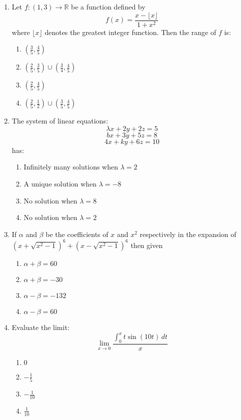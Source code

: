 \documentclass{article}
\begin{document}
\begin{enumerate}
\item Let $f: (1,3) \to \mathbb{R}$ be a function defined by 
\[
f(x) = \frac{x - \lfloor x \rfloor}{1 + x^2}
\]
where $\lfloor x \rfloor$ denotes the greatest integer function. Then the range of $f$ is:

\begin{enumerate}
	\item $(\frac{3}{5}, \frac{4}{5})$
	\item $(\frac{2}{5},\frac{3}{5}) \cup (\frac{3}{4},\frac{4}{5})$
	\item $(\frac{2}{5},\frac{4}{5})$
	\item $(\frac{2}{5},\frac{1}{2}) \cup (\frac{3}{5},\frac{4}{5})$

\end{enumerate}

\item The system of linear equations:
\[\lambda x + 2y + 2z = 5\]
\[bx + 3y + 5z = 8\]
\[4x + ky + 6z = 10\]
has:

\begin{enumerate}
    \item Infinitely many solutions when $\lambda = 2$
    \item A unique solution when $\lambda = -8$
    \item No solution when $\lambda = 8$
    \item No solution when $\lambda = 2$
\end{enumerate}

\item If $\alpha$ and $\beta$ be the coefficients of $x$ and $x^2$ respectively in the expansion of 
	$( x + \sqrt{x^2 - 1})^6 + ( x - \sqrt{x^2 - 1})^6 $
then given

\begin{enumerate}
    \item $\alpha + \beta = 60$
    \item $\alpha + \beta = -30$
    \item $\alpha - \beta = -132$
    \item $\alpha - \beta = 60$
\end{enumerate}

\item Evaluate the limit:
\[
\lim_{x \to 0} \frac{\int_0^x t \sin(10t) \,dt}{x}
\]


\begin{enumerate}
    \item $0$
    \item $-\frac{1}{5}$
    \item $-\frac{1}{10}$
    \item $\frac{1}{10}$
\end{enumerate}


\end{enumerate}
\end{document}

